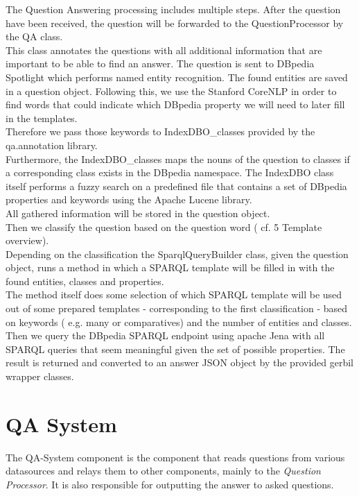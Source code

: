 \documentclass[runningheads]{llncs}
\begin{document}
The Question Answering processing includes multiple steps. After the question have been received, the question will be forwarded to the QuestionProcessor by the QA class. \\
This class annotates the questions with all additional information that are important to be able to find an answer. 
The question is sent to DBpedia Spotlight which performs named entity recognition. The found entities are saved in a question object. 
Following this, we use the Stanford CoreNLP \cite{stanford} in order to find words that could indicate which DBpedia property we will need to later fill in the templates. \\
Therefore we pass those keywords to  IndexDBO\_classes provided by the qa.annotation library. \\
Furthermore, the IndexDBO\_classes maps the nouns of the question to classes if a corresponding class exists in the DBpedia namespace. The IndexDBO class itself performs a fuzzy search on a predefined file that contains a set of DBpedia properties and keywords using the Apache Lucene library. \\
All gathered information will be stored in the question object. \\
Then we classify the question based on the question word ( cf. 5 Template overview). \\
Depending on the classification the SparqlQueryBuilder class, given the question object, runs a method in which a SPARQL template will be filled in with the found entities, classes and properties. \\
The method itself does some selection of which SPARQL template will be used out of some prepared templates - corresponding to the first classification - based on keywords ( e.g. many or comparatives) and the number of entities and classes. \\
Then we query the DBpedia SPARQL endpoint using apache Jena with all SPARQL queries that seem meaningful given the set of possible properties.
The result is returned and converted to an answer JSON object by the provided gerbil wrapper classes. \\


\section{QA System}

The QA-System component is the component that reads questions from various datasources and relays them to other components, mainly to the \emph{Question Processor}. It is also responsible for outputting the answer to asked questions. \\
	
\end{document}

